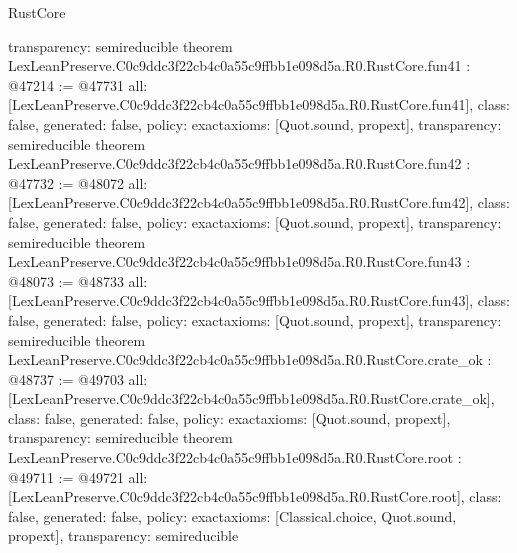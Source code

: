 \begin{lexlean}{RustCore}
\begin{coremodule}
{  transparency: semireducible
}
theorem LexLeanPreserve.C0c9ddc3f22cb4c0a55c9ffbb1e098d5a.R0.RustCore.fun41 : @47214 := @47731 {
  all: [LexLeanPreserve.C0c9ddc3f22cb4c0a55c9ffbb1e098d5a.R0.RustCore.fun41],
  class: false,
  generated: false,
  policy: exact{axioms: [Quot.sound, propext]},
  transparency: semireducible
}
theorem LexLeanPreserve.C0c9ddc3f22cb4c0a55c9ffbb1e098d5a.R0.RustCore.fun42 : @47732 := @48072 {
  all: [LexLeanPreserve.C0c9ddc3f22cb4c0a55c9ffbb1e098d5a.R0.RustCore.fun42],
  class: false,
  generated: false,
  policy: exact{axioms: [Quot.sound, propext]},
  transparency: semireducible
}
theorem LexLeanPreserve.C0c9ddc3f22cb4c0a55c9ffbb1e098d5a.R0.RustCore.fun43 : @48073 := @48733 {
  all: [LexLeanPreserve.C0c9ddc3f22cb4c0a55c9ffbb1e098d5a.R0.RustCore.fun43],
  class: false,
  generated: false,
  policy: exact{axioms: [Quot.sound, propext]},
  transparency: semireducible
}
theorem LexLeanPreserve.C0c9ddc3f22cb4c0a55c9ffbb1e098d5a.R0.RustCore.crate_ok : @48737 := @49703 {
  all: [LexLeanPreserve.C0c9ddc3f22cb4c0a55c9ffbb1e098d5a.R0.RustCore.crate_ok],
  class: false,
  generated: false,
  policy: exact{axioms: [Quot.sound, propext]},
  transparency: semireducible
}
theorem LexLeanPreserve.C0c9ddc3f22cb4c0a55c9ffbb1e098d5a.R0.RustCore.root : @49711 := @49721 {
  all: [LexLeanPreserve.C0c9ddc3f22cb4c0a55c9ffbb1e098d5a.R0.RustCore.root],
  class: false,
  generated: false,
  policy: exact{axioms: [Classical.choice, Quot.sound, propext]},
  transparency: semireducible
}


\end{coremodule}
\end{lexlean}
